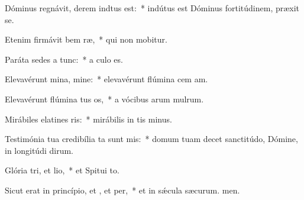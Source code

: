 \item Dóminus regnávit, derem indtus est:~* indútus est Dóminus fortitúdinem,  præxit se.
\item Etenim firmávit bem ræ,~* qui non mobitur.
\item Paráta sedes a  tunc:~* a culo  es.
\item Elevavérunt mina, mine:~* elevavérunt flúmina cem am.
\item Elevavérunt flúmina tus os,~* a vócibus arum mulrum.
\item Mirábiles elatines ris:~* mirábilis in tis minus.
\item Testimónia tua credibília ta sunt mis:~* domum tuam decet sanctitúdo, Dómine, in longitúdi dirum.
\item Glória tri, et lio,~* et Spitui to.
\item Sicut erat in princípio, et , et per,~* et in sǽcula sæcurum. men.
